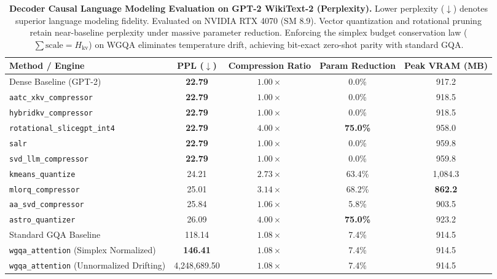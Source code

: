 \begin{table}[t]
\centering
\caption{\textbf{Decoder Causal Language Modeling Evaluation on GPT-2 WikiText-2 (Perplexity).}
Lower perplexity ($\downarrow$) denotes superior language modeling fidelity. Evaluated on NVIDIA RTX 4070 (SM 8.9).
Vector quantization and rotational pruning retain near-baseline perplexity under massive parameter reduction.
Enforcing the simplex budget conservation law ($\sum \text{scale} = H_{\text{kv}}$) on WGQA eliminates temperature drift, achieving bit-exact zero-shot parity with standard GQA.}
\label{tab:decoder}
\small
\setlength{\tabcolsep}{4.5pt}
\begin{tabular}{lcccc}
\toprule
\textbf{Method / Engine} & \textbf{PPL ($\downarrow$)} & \textbf{Compression Ratio} & \textbf{Param Reduction} & \textbf{Peak VRAM (MB)} \\
\midrule
Dense Baseline (GPT-2) & \textbf{22.79} & $1.00\times$ & 0.0\% & 917.2 \\
\texttt{aatc\_xkv\_compressor} & \textbf{22.79} & $1.00\times$ & 0.0\% & 918.5 \\
\texttt{hybridkv\_compressor} & \textbf{22.79} & $1.00\times$ & 0.0\% & 918.5 \\
\texttt{rotational\_slicegpt\_int4} & \textbf{22.79} & $\mathbf{4.00\times}$ & \textbf{75.0\%} & 958.0 \\
\texttt{salr} & \textbf{22.79} & $1.00\times$ & 0.0\% & 959.8 \\
\texttt{svd\_llm\_compressor} & \textbf{22.79} & $1.00\times$ & 0.0\% & 959.8 \\
\texttt{kmeans\_quantize} & 24.21 & $2.73\times$ & 63.4\% & 1,084.3 \\
\texttt{mlorq\_compressor} & 25.01 & $3.14\times$ & 68.2\% & \textbf{862.2} \\
\texttt{aa\_svd\_compressor} & 25.84 & $1.06\times$ & 5.8\% & 903.5 \\
\texttt{astro\_quantizer} & 26.09 & $\mathbf{4.00\times}$ & \textbf{75.0\%} & 923.2 \\
\midrule
Standard GQA Baseline & 118.14 & $1.08\times$ & 7.4\% & 914.5 \\
\texttt{wgqa\_attention} (Simplex Normalized) & \textbf{146.41} & $1.08\times$ & 7.4\% & 914.5 \\
\texttt{wgqa\_attention} (Unnormalized Drifting) & 4,248,689.50 & $1.08\times$ & 7.4\% & 914.5 \\
\bottomrule
\end{tabular}
\end{table}
